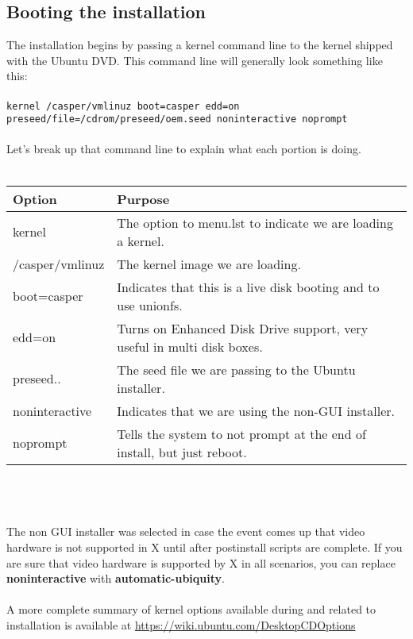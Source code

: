\documentclass[letterpaper,10pt,titlepage]{article}
\begin{document}
\subsection{Booting the installation}
The installation begins by passing a kernel command line to the kernel shipped with the Ubuntu DVD.  This command line will generally look something like this:
\\
\\
\texttt{kernel /casper/vmlinuz boot=casper edd=on preseed/file=/cdrom/preseed/oem.seed noninteractive noprompt}
\\
\\
Let's break up that command line to explain what each portion is doing.
\\
\\
\begin{tabular}{|l|l|}
\hline \textbf{Option} & \textbf{Purpose} \\ 
\hline kernel & The option to menu.lst to indicate we are loading a kernel. \\ 
\hline /casper/vmlinuz &  The kernel image we are loading. \\ 
\hline boot=casper & Indicates that this is a live disk booting and to use unionfs. \\ 
\hline edd=on & Turns on Enhanced Disk Drive support, very useful in multi disk boxes. \\ 
\hline preseed.. & The seed file we are passing to the Ubuntu installer. \\ 
\hline noninteractive & Indicates that we are using the non-GUI installer. \\ 
\hline noprompt & Tells the system to not prompt at the end of install, but just reboot. \\ 
\hline 
\end{tabular} 
\\
\\
\\
The non GUI installer was selected in case the event comes up that video hardware is not supported in X until after postinstall scripts are complete.  If you are sure that video hardware is supported by X in all scenarios, you can replace \textbf{noninteractive} with \textbf{automatic-ubiquity}.
\\
\\
A more complete summary of kernel options available during and related to installation is available at \url{https://wiki.ubuntu.com/DesktopCDOptions}
\end{document}
